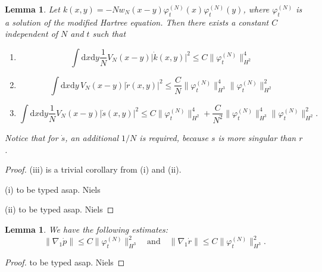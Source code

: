 \documentclass[11pt,a4paper]{scrartcl}
\newtheorem{lem}[thm]{Lemma}
\newcommand{\di}{\textrm{d}}		%
\newcommand{\norm}[1]{\lVert#1\rVert}	%
\newcommand{\ph}{\varphi_t^{(N)}}	%
\newcommand{\bd}{\begin{displaymath}}			%
\newcommand{\ed}{\end{displaymath}}
\begin{document}
\begin{lem}
Let $k(x,y) = -N w_N(x-y) \ph(x) \ph(y)$, where $\ph$ is a solution of the modified Hartree equation. Then there exists a constant $C$ independent of $N$ and $t$ such that
\begin{enumerate}
 \item
\bd
\int \di x \di y \frac{1}{N} V_N(x-y) \lvert \dot k(x,y)\rvert^2 \leq C \norm{\ph}_{H^2}^4
\ed 
 \item
\bd
\int \di x\di y\, V_N(x-y) \lvert \dot r(x,y)\rvert^2 \leq \frac{C}{N} \norm{\ph}_{H^3}^4 \norm{\ph}_{H^2}^2
\ed
 \item
\bd
\int \di x\di y\frac{1}{N} V_N(x-y) \lvert \dot s(x,y)\rvert^2 \leq C \norm{\ph}_{H^2}^4 + \frac{C}{N^2} \norm{\ph}_{H^3}^4 \norm{\ph}_{H^2}^2.
\ed
\end{enumerate}
Notice that for $\dot s$, an additional $1/N$ is required, because $s$ is more singular than $r$.
\end{lem}
\begin{proof} (iii) is a trivial corollary from (i) and (ii).

(i) to be typed asap. Niels

(ii) to be typed asap. Niels
\end{proof}

\begin{lem}
 We have the following estimates:
\bd
\norm{\nabla_1 \dot p} \leq C \norm{\ph}_{H^3}^2 \quad \mbox{and} \quad \norm{\nabla _1 \dot r} \leq C \norm{\ph}_{H^3}^2.
\ed
\end{lem}
\begin{proof}
 to be typed asap. Niels
\end{proof}
\end{document}
